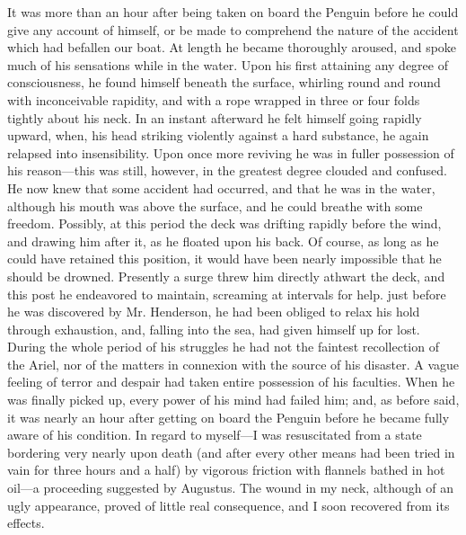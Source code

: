 It was more than an hour after being taken on board the Penguin before he
could give any account of himself, or be made to comprehend the nature of the
accident which had befallen our boat. At length he became thoroughly aroused,
and spoke much of his sensations while in the water. Upon his first attaining
any degree of consciousness, he found himself beneath the surface, whirling
round and round with inconceivable rapidity, and with a rope wrapped in three or
four folds tightly about his neck. In an instant afterward he felt himself going
rapidly upward, when, his head striking violently against a hard substance, he
again relapsed into insensibility. Upon once more reviving he was in fuller
possession of his reason---this was still, however, in the greatest degree
clouded and confused. He now knew that some accident had occurred, and that he
was in the water, although his mouth was above the surface, and he could breathe
with some freedom. Possibly, at this period the deck was drifting rapidly before
the wind, and drawing him after it, as he floated upon his back. Of course, as
long as he could have retained this position, it would have been nearly
impossible that he should be drowned. Presently a surge threw him directly
athwart the deck, and this post he endeavored to maintain, screaming at
intervals for help. just before he was discovered by Mr. Henderson, he had been
obliged to relax his hold through exhaustion, and, falling into the sea, had
given himself up for lost. During the whole period of his struggles he had not
the faintest recollection of the Ariel, nor of the matters in connexion with the
source of his disaster. A vague feeling of terror and despair had taken entire
possession of his faculties. When he was finally picked up, every power of his
mind had failed him; and, as before said, it was nearly an hour after getting on
board the Penguin before he became fully aware of his condition. In regard to
myself---I was resuscitated from a state bordering very nearly upon death (and
after every other means had been tried in vain for three hours and a half) by
vigorous friction with flannels bathed in hot oil---a proceeding suggested by
Augustus. The wound in my neck, although of an ugly appearance, proved of little
real consequence, and I soon recovered from its effects. 

